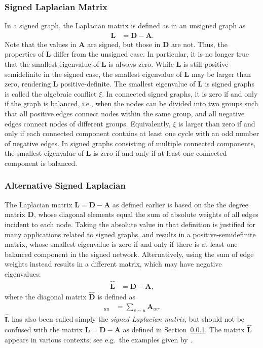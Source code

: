 \documentclass{article}
\begin{document}
\subsubsection{Signed Laplacian Matrix}
\label{sec:decomposition:lap:signed}
In a signed graph, the Laplacian matrix is defined as in an unsigned
graph as
\begin{align*}
  \mathbf L &= \mathbf D - \mathbf A.
\end{align*}
Note that the values in $\mathbf A$ are signed, but those in $\mathbf D$
are not.  Thus, the properties of $\mathbf L$ differ from the unsigned
case.  In particular, it is no longer true that the smallest eigenvalue
of $\mathbf L$ is always zero.  While $\mathbf L$ is still
positive-semidefinite in the signed case, 
the smallest eigenvalue of $\mathbf L$ may be larger than zero,
rendering $\mathbf L$ positive-definite. 
The smallest eigenvalue of $\mathbf L$ is signed graphs is called 
the algebraic conflict $\xi$.  In connected signed graphs, it is zero if and only if the graph is balanced,
i.e., when the nodes can be divided into two groups such that all
positive edges connect nodes within the same group, and all negative
edges connect nodes of different groups.  Equivalently, $\xi$ is larger
than zero if and only if each connected component contains at least one
cycle with an odd number of negative edges. 
In signed graphs consisting of multiple connected components, the
smallest eigenvalue of $\mathbf L$ is zero if and only if at least one
connected component is balanced.  

\subsubsection{Alternative Signed Laplacian}
The Laplacian matrix $\mathbf L = \mathbf D - \mathbf A$ as defined
earlier is based on the the degree matrix $\mathbf D$, whose diagonal
elements equal the sum of absolute weights of all edges incident to each
node.  
Taking the absolute value in that definition is justified for
many applications related to signed graphs, and results in a positive-semidefinite matrix, whose
smallest eigenvalue is zero if and only if there is at least one
balanced component in the signed network.  Alternatively, using the sum
of edge weights instead results in a different matrix, which may have
negative eigenvalues:
\begin{align}
  \mathbf{\hat L} &= \mathbf{\hat D} - \mathbf A,
\end{align}
where the diagonal matrix $\mathbf{\hat D}$ is defined as
\begin{align*}
  [\mathbf{\hat D}]_{uu} &= \sum_{v \sim u} \mathbf A_{uv}.
\end{align*}
$\mathbf{\hat L}$ has also been called simply the \emph{signed Laplacian
  matrix}, but should not be confused with the matrix $\mathbf L =
\mathbf D - \mathbf A$ as defined in
Section~\ref{sec:decomposition:lap:signed}. 
The matrix $\mathbf{\hat L}$ appears in various contexts; see e.g.\ the
examples given by \cite{b875}.  
\end{document}
